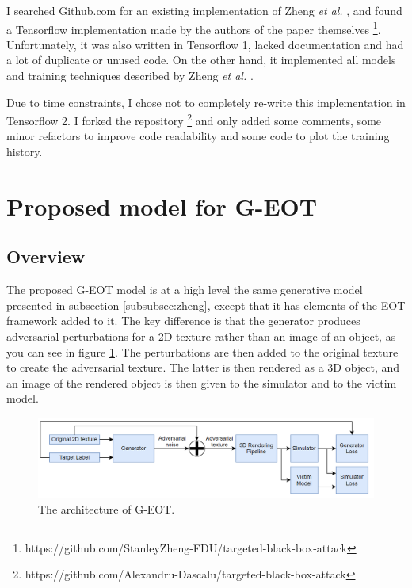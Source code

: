 I searched Github.com for an existing implementation of Zheng \textit{et al.} \cite{zheng_black_box_GAN}, and found a Tensorflow implementation made by the authors of the paper themselves \footnote{https://github.com/StanleyZheng-FDU/targeted-black-box-attack}. Unfortunately, it was also written in Tensorflow 1, lacked documentation and had a lot of duplicate or unused code. On the other hand, it implemented all models and training techniques described by Zheng \textit{et al.} \cite{zheng_black_box_GAN}.

Due to time constraints, I chose not to completely re-write this implementation in Tensorflow 2. I forked the repository \footnote{https://github.com/Alexandru-Dascalu/targeted-black-box-attack} and only added some comments, some minor refactors to improve code readability and some code to plot the training history.

\section{Proposed model for G-EOT}
    \label{sec:proposed_model}
    
\subsection{Overview}
    \label{subsec:g_eot_overview}

The proposed G-EOT model is at a high level the same generative model presented in subsection \ref{subsubsec:zheng}, except that it has elements of the EOT framework \cite{athalye} added to it. The key difference is that the generator produces adversarial perturbations for a 2D texture rather than an image of an object, as you can see in figure \ref{fig:architecture}. The perturbations are then added to the original texture to create the adversarial texture. The latter is then rendered as a 3D object, and an image of the rendered object is then given to the simulator and to the victim model.

\begin{figure}[h]
    \centering
    \includegraphics[width=1\textwidth]{graphics/architecture.PNG}
    \caption{The architecture of G-EOT.}
    \label{fig:architecture}
\end{figure}

